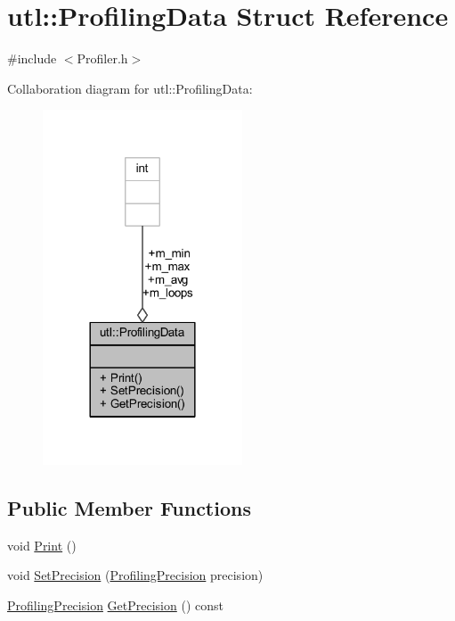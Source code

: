 \hypertarget{structutl_1_1_profiling_data}{}\section{utl\+:\+:Profiling\+Data Struct Reference}
\label{structutl_1_1_profiling_data}


{\ttfamily \#include $<$Profiler.\+h$>$}



Collaboration diagram for utl\+:\+:Profiling\+Data\+:\nopagebreak
\begin{figure}[H]
\begin{center}
\leavevmode
\includegraphics[width=168pt]{structutl_1_1_profiling_data__coll__graph}
\end{center}
\end{figure}
\subsection*{Public Member Functions}
\begin{DoxyCompactItemize}
\item 
void \mbox{\hyperlink{structutl_1_1_profiling_data_a3e8f6def33303b7ce5320fb09155dbb3}{Print}} ()
\item 
void \mbox{\hyperlink{structutl_1_1_profiling_data_a8e2f3fe4351986350852004a8eb40954}{Set\+Precision}} (\mbox{\hyperlink{namespaceutl_ad221bb3fac593651670bdc0263b92707}{Profiling\+Precision}} precision)
\item 
\mbox{\hyperlink{namespaceutl_ad221bb3fac593651670bdc0263b92707}{Profiling\+Precision}} \mbox{\hyperlink{structutl_1_1_profiling_data_a4f2ba31f629d70115facc3aa7dc3fe11}{Get\+Precision}} () const
\end{DoxyCompactItemize}
